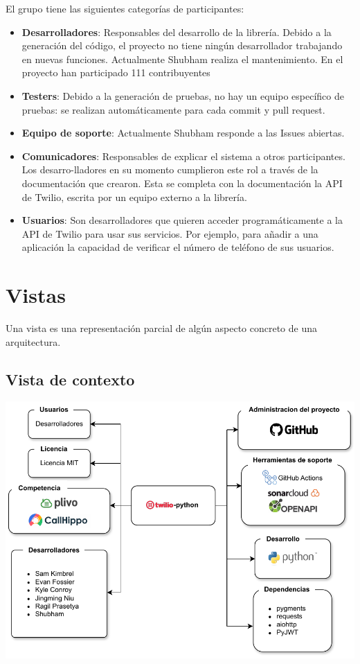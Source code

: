 \documentclass{article}
\begin{document}
El grupo tiene las siguientes categorías de participantes:

\begin{itemize}
  \setlength\itemsep{0em}
  \item \textbf{Desarrolladores}: Responsables del desarrollo
  de la librería. Debido a la generación del código,
  el proyecto no tiene ningún desarrollador trabajando en nuevas funciones.
  Actualmente Shubham realiza el mantenimiento. En el proyecto han participado 111 contribuyentes
  \item \textbf{Testers}: Debido a la generación de pruebas,
  no hay un equipo específico de pruebas:
  se realizan automáticamente para cada commit y pull request.
  \item \textbf{Equipo de soporte}: Actualmente
  Shubham responde a las Issues abiertas.
  \item \textbf{Comunicadores}: Responsables de explicar el sistema
  a otros participantes. Los desarro-lladores en su momento
  cumplieron este rol a través de la documentación que crearon.
  Esta se completa con la documentación la API de Twilio,
  escrita por un equipo externo a la librería.
  \item \textbf{Usuarios}: Son desarrolladores que quieren
  acceder programáticamente a la API de Twilio para usar sus servicios.
  Por ejemplo, para añadir a una aplicación
  la capacidad de verificar el número de teléfono de sus usuarios.
\end{itemize}

\section{Vistas}
Una vista es una representación parcial de algún aspecto concreto de una arquitectura.

\subsection{Vista de contexto}

\hfill

\begin{center}
  \includegraphics[width=\textwidth]{VistaContexto.pdf}
  \label{fig:vista contexto}
\end{center}
\end{document}
